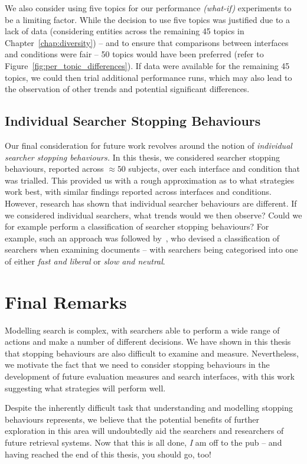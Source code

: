 We also consider using five topics for our performance \emph{(what-if)} experiments to be a limiting factor. While the decision to use five topics was justified due to a lack of data (considering entities across the remaining 45 topics in Chapter~\ref{chap:diversity}) -- and to ensure that comparisons between interfaces and conditions were fair -- 50 topics would have been preferred (refer to Figure~\ref{fig:per_topic_differences}). If data were available for the remaining 45 topics, we could then trial additional performance runs, which may also lead to the observation of other trends and potential significant differences.

\subsection{Individual Searcher Stopping Behaviours}
Our final consideration for future work revolves around the notion of \emph{individual searcher stopping behaviours.} In this thesis, we considered searcher stopping behaviours, reported across $\approx50$ subjects, over each interface and condition that was trialled. This provided us with a rough approximation as to what strategies work best, with similar findings reported across interfaces and conditions. However, research has shown that individual searcher behaviours are different. If we considered individual searchers, what trends would we then observe? Could we for example perform a classification of searcher stopping behaviours? For example, such an approach was followed by~\cite{smucker2011user_strategies}, who devised a classification of searchers when examining documents -- with searchers being categorised into one of either \emph{fast and liberal} or \emph{slow and neutral}.

\section{Final Remarks}\label{sec:conclusions:remarks}
Modelling search is complex, with searchers able to perform a wide range of actions and make a number of different decisions. We have shown in this thesis that stopping behaviours are also difficult to examine and measure. Nevertheless, we motivate the fact that we need to consider stopping behaviours in the development of future evaluation measures and search interfaces, with this work suggesting what strategies will perform well.

Despite the inherently difficult task that understanding and modelling stopping behaviours represents, we believe that the potential benefits of further exploration in this area will undoubtedly aid the searchers and researchers of future retrieval systems. Now that this is all done, \emph{I} am off to the pub -- and having reached the end of this thesis, you should go, too!